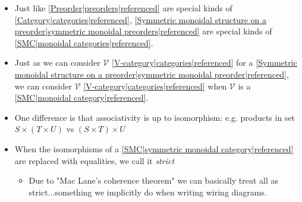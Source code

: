 \begin{itemize}
    \item Just like \ref{Preorder|preorders|referenced} are special kinds of \ref{Category|categories|referenced}, \ref{Symmetric monoidal structure on a preorder|symmetric monoidal preorders|referenced} are special kinds of \ref{SMC|monoidal categories|referenced}.
    \item Just as we can consider $\mathcal{V}$ \ref{V-category|categories|referenced} for a \ref{Symmetric monoidal structure on a preorder|symmetric monoidal preorder|referenced}, we can consider $\mathcal{V}$ \ref{V-category|categories|referenced} when $\mathcal{V}$ is a \ref{SMC|monoidal category|referenced}.
    \item One difference is that associativity is up to isomorphism: e.g. products in set $S \times (T \times U)$ vs $(S \times T) \times U$
    \item When the isomorphisms of a \ref{SMC|symmetric monoidal category|referenced} are replaced with equalities, we call it \emph{strict}
          \begin{itemize}
            \item Due to "Mac Lane's coherence theorem" we can basically treat all as strict...something we implicitly do when writing wiring diagrams.
          \end{itemize}

  \end{itemize}
